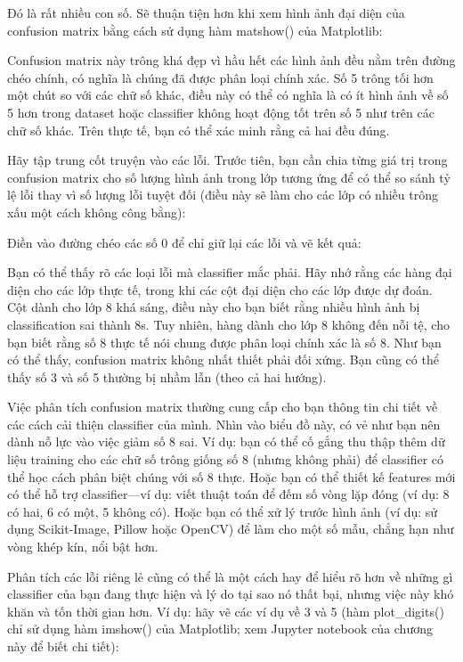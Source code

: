 Đó là rất nhiều con số. Sẽ thuận tiện hơn khi xem hình ảnh đại diện của confusion matrix bằng cách sử dụng hàm matshow() của Matplotlib:

Confusion matrix này trông khá đẹp vì hầu hết các hình ảnh đều nằm trên đường chéo chính, có nghĩa là chúng đã được phân loại chính xác. Số 5 trông tối hơn một chút so với các chữ số khác, điều này có thể có nghĩa là có ít hình ảnh về số 5 hơn trong dataset hoặc classifier không hoạt động tốt trên số 5 như trên các chữ số khác. Trên thực tế, bạn có thể xác minh rằng cả hai đều đúng.

Hãy tập trung cốt truyện vào các lỗi. Trước tiên, bạn cần chia từng giá trị trong confusion matrix cho số lượng hình ảnh trong lớp tương ứng để có thể so sánh tỷ lệ lỗi thay vì số lượng lỗi tuyệt đối (điều này sẽ làm cho các lớp có nhiều trông xấu một cách không công bằng):

Điền vào đường chéo các số 0 để chỉ giữ lại các lỗi và vẽ kết quả:

Bạn có thể thấy rõ các loại lỗi mà classifier mắc phải. Hãy nhớ rằng các hàng đại diện cho các lớp thực tế, trong khi các cột đại diện cho các lớp được dự đoán. Cột dành cho lớp 8 khá sáng, điều này cho bạn biết rằng nhiều hình ảnh bị classification sai thành 8s. Tuy nhiên, hàng dành cho lớp 8 không đến nỗi tệ, cho bạn biết rằng số 8 thực tế nói chung được phân loại chính xác là số 8. Như bạn có thể thấy, confusion matrix không nhất thiết phải đối xứng. Bạn cũng có thể thấy số 3 và số 5 thường bị nhầm lẫn (theo cả hai hướng).

Việc phân tích confusion matrix thường cung cấp cho bạn thông tin chi tiết về các cách cải thiện classifier của mình. Nhìn vào biểu đồ này, có vẻ như bạn nên dành nỗ lực vào việc giảm số 8 sai. Ví dụ: bạn có thể cố gắng thu thập thêm dữ liệu training cho các chữ số trông giống số 8 (nhưng không phải) để classifier có thể học cách phân biệt chúng với số 8 thực. Hoặc bạn có thể thiết kế features mới có thể hỗ trợ classifier—ví dụ: viết thuật toán để đếm số vòng lặp đóng (ví dụ: 8 có hai, 6 có một, 5 không có). Hoặc bạn có thể xử lý trước hình ảnh (ví dụ: sử dụng Scikit-Image, Pillow hoặc OpenCV) để làm cho một số mẫu, chẳng hạn như vòng khép kín, nổi bật hơn.

Phân tích các lỗi riêng lẻ cũng có thể là một cách hay để hiểu rõ hơn về những gì classifier của bạn đang thực hiện và lý do tại sao nó thất bại, nhưng việc này khó khăn và tốn thời gian hơn. Ví dụ: hãy vẽ các ví dụ về 3 và 5 (hàm plot\_digits() chỉ sử dụng hàm imshow() của Matplotlib; xem Jupyter notebook của chương này để biết chi tiết):


